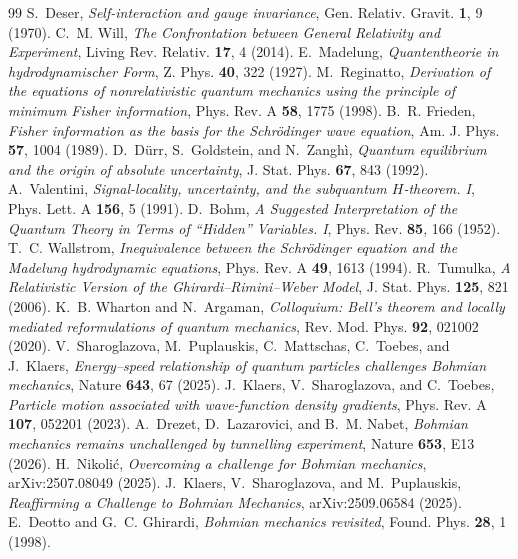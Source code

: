 \documentclass[11pt]{article}
\begin{document}
\begin{thebibliography}{99}
 S.~Deser, \emph{Self-interaction and gauge invariance}, Gen. Relativ. Gravit. \textbf{1}, 9 (1970).
 C.~M. Will, \emph{The Confrontation between General Relativity and Experiment}, Living Rev. Relativ. \textbf{17}, 4 (2014).
 E.~Madelung, \emph{Quantentheorie in hydrodynamischer Form}, Z. Phys. \textbf{40}, 322 (1927).
 M.~Reginatto, \emph{Derivation of the equations of nonrelativistic quantum mechanics using the principle of minimum Fisher information}, Phys. Rev. A \textbf{58}, 1775 (1998).
 B.~R. Frieden, \emph{Fisher information as the basis for the Schr\"odinger wave equation}, Am. J. Phys. \textbf{57}, 1004 (1989).
 D.~D\"urr, S.~Goldstein, and N.~Zangh\`i, \emph{Quantum equilibrium and the origin of absolute uncertainty}, J. Stat. Phys. \textbf{67}, 843 (1992).
 A.~Valentini, \emph{Signal-locality, uncertainty, and the subquantum $H$-theorem. I}, Phys. Lett. A \textbf{156}, 5 (1991).
 D.~Bohm, \emph{A Suggested Interpretation of the Quantum Theory in Terms of ``Hidden'' Variables. I}, Phys. Rev. \textbf{85}, 166 (1952).
 T.~C. Wallstrom, \emph{Inequivalence between the Schr\"odinger equation and the Madelung hydrodynamic equations}, Phys. Rev. A \textbf{49}, 1613 (1994).
 R.~Tumulka, \emph{A Relativistic Version of the Ghirardi--Rimini--Weber Model}, J. Stat. Phys. \textbf{125}, 821 (2006).
 K.~B. Wharton and N.~Argaman, \emph{Colloquium: Bell's theorem and locally mediated reformulations of quantum mechanics}, Rev. Mod. Phys. \textbf{92}, 021002 (2020).
 V.~Sharoglazova, M.~Puplauskis, C.~Mattschas, C.~Toebes, and J.~Klaers, \emph{Energy--speed relationship of quantum particles challenges Bohmian mechanics}, Nature \textbf{643}, 67 (2025).
 J.~Klaers, V.~Sharoglazova, and C.~Toebes, \emph{Particle motion associated with wave-function density gradients}, Phys. Rev. A \textbf{107}, 052201 (2023).
 A.~Drezet, D.~Lazarovici, and B.~M. Nabet, \emph{Bohmian mechanics remains unchallenged by tunnelling experiment}, Nature \textbf{653}, E13 (2026).
 H.~Nikoli\'c, \emph{Overcoming a challenge for Bohmian mechanics}, arXiv:2507.08049 (2025).
 J.~Klaers, V.~Sharoglazova, and M.~Puplauskis, \emph{Reaffirming a Challenge to Bohmian Mechanics}, arXiv:2509.06584 (2025).
 E.~Deotto and G.~C. Ghirardi, \emph{Bohmian mechanics revisited}, Found. Phys. \textbf{28}, 1 (1998).

\end{thebibliography}
\end{document}
